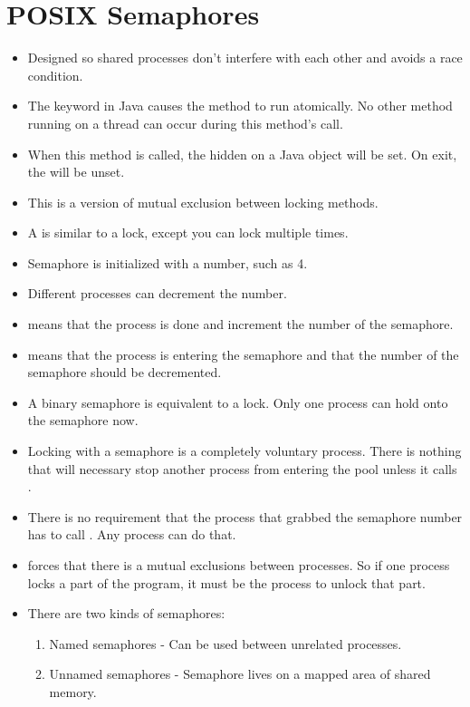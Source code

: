 \documentclass[]{article}
\begin{document}
\section{POSIX Semaphores}
\begin{itemize}
\item Designed so shared processes don't interfere with each other and avoids a
race condition.
\item The keyword  in Java causes the method to run
atomically. No other method running on a thread can occur during this method's
call.
\item When this method is called, the hidden  on a Java object will
be set. On exit, the  will be unset.
\item This is a version of mutual exclusion between locking methods.
\item A  is similar to a lock, except you can lock multiple
times.
\item Semaphore is initialized with a number, such as 4.
\item Different processes can decrement the number.
\item {} means that the process is done and increment the number
of the semaphore.
\item {} means that the process is entering the semaphore and that
the number of the semaphore should be decremented.
\item A binary semaphore is equivalent to a  lock. Only one process
can hold onto the semaphore now.
\item Locking with a semaphore is a completely voluntary process. There is
nothing that will necessary stop another process from entering the pool unless
it calls .
\item There is no requirement that the process that grabbed the semaphore number
has to call . Any process can do that.
\item {} forces that there is a mutual exclusions between processes.
So if one process locks a part of the program, it must be the process to unlock
that part.
\item There are two kinds of semaphores:
\begin{enumerate}
\item Named semaphores - Can be used between unrelated processes.
\item Unnamed semaphores - Semaphore lives on a mapped area of shared memory.
\end{enumerate}

\end{itemize}
\end{document}
